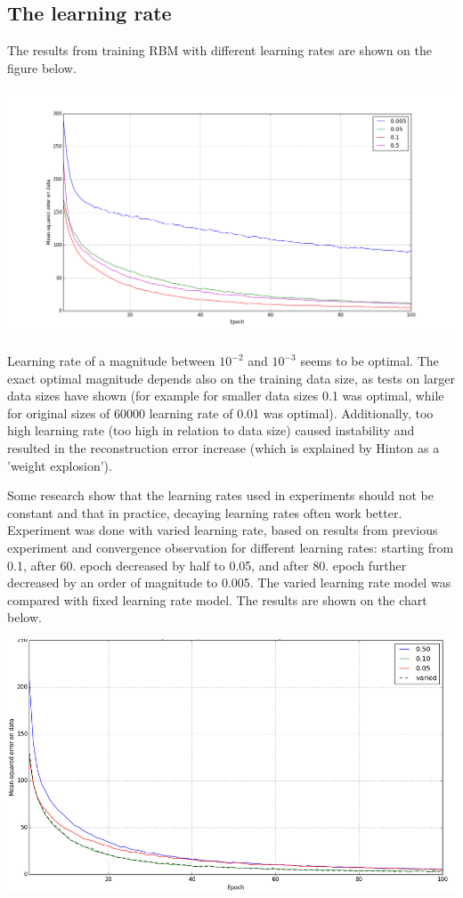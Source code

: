 \documentclass[a4paper]{scrartcl}
\begin{document}
\subsection{The learning rate}
\par The results from training RBM with different learning rates are shown on the figure below.
\begin{center}
\includegraphics[width=14cm]{images/lr.png}
\end{center}
Learning rate of a magnitude between $10^{-2}$ and $10^{-3}$ seems to be optimal. The exact optimal magnitude depends also on the training data size, as tests on larger data sizes have shown (for example for smaller data sizes 0.1 was optimal, while for original sizes of 60000 learning rate of 0.01 was optimal). Additionally, too high learning rate (too high in relation to data size) caused instability and resulted in the reconstruction error increase (which is explained by Hinton \cite{Hinton} as a 'weight explosion'). 
\par Some research \cite{Tieleman} show that the learning rates used in experiments should not be constant and that in practice, decaying learning rates often work better. Experiment was done with varied learning rate, based on results from previous experiment and convergence observation for different learning rates: starting from 0.1, after 60. epoch decreased by half to 0.05, and after 80. epoch further decreased by an order of magnitude to 0.005. The varied learning rate model was compared with fixed learning rate model. The results are shown on the chart below.
\begin{center}
\includegraphics[width=14cm]{images/lr_var.png}
\end{center}
\end{document}
